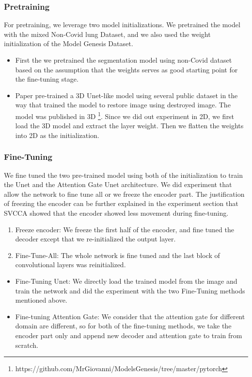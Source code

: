 \subsubsection{Pretraining}
For pretraining, we leverage two model initializations. We pretrained the model with the mixed Non-Covid lung Dataset, and we also used the weight initialization of the Model Genesis Dataset.
\begin{itemize}
	\item First the we pretrained the segmentation model using non-Covid dataset based on the assumption that the weights serves as good starting point for the fine-tuning stage.
	\item \color{red}Paper \cite{zhou_models_2019} pre-trained a 3D Unet-like model using several public dataset in the way that trained the model to restore image using destroyed image. The model was published in 3D \footnote{https://github.com/MrGiovanni/ModelsGenesis/tree/master/pytorch}. Since we did out experiment in 2D, we first load the 3D model and extract the layer weight. Then we flatten the weights into 2D as the initialization.
\end{itemize}

\subsubsection{Fine-Tuning}
We fine tuned the two pre-trained model using both of the initialization to train the Unet and the Attention Gate Unet architecture. We did experiment that allow the network to fine tune all or we freeze the encoder part. The justification of freezing the encoder can be further explained in the experiment section that SVCCA showed that the encoder showed less movement during fine-tuning.

\begin{enumerate}
	\item Freeze encoder: We freeze the first half of the encoder, and fine tuned the decoder except that we re-initialized the output layer.
	\item Fine-Tune-All: The whole network is fine tuned and the last block of convolutional layers was reinitialized.
\end{enumerate}

\begin{itemize}
	\item Fine-Tuning Unet: We directly load the trained model from the image and train the network and did the experiment with the two Fine-Tuning methods mentioned above.
	\item Fine-tuning Attention Gate: We consider that the attention gate for different domain are different, so for both of the fine-tuning methods, we take the encoder part only and append new decoder and attention gate to train from scratch.
\end{itemize}


